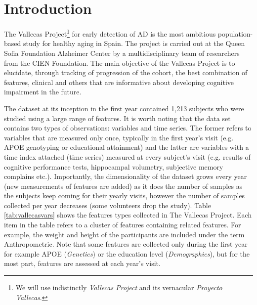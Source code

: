 \documentclass[11pt]{article}
\theoremstyle{definition}
\theoremstyle{remark}
\begin{document}
\section{Introduction}
\label{se:int}
The Vallecas Project\footnote{We will use indistinctly \emph{Vallecas Project} and its vernacular \emph{Proyecto Vallecas}.} for early detection of AD is the most ambitious population-based study for healthy aging in Spain. The project is carried out at the Queen Sofia Foundation Alzheimer Center by a multidisciplinary team of researchers from the CIEN Foundation. The main objective of the Vallecas Project is to elucidate, through tracking of progression of the cohort, the best combination of features, clinical and others that are informative about developing cognitive impairment in the future. 

The dataset at its inception in the first year contained 1,213 subjects who were studied using a large range of features. It is worth noting that the data set contains two types of observations: variables and time series. The former refers to variables that are measured only once, typically in the first year's visit (e.g. APOE genotyping or educational attainment) and the latter are variables with a time index attached (time series) measured at every subject's visit (e.g. results of cognitive performance tests, hippocampal volumetry, subjective memory complains etc.).
Importantly, the dimensionality of the dataset grows every year (new measurements of features are added) as it does the number of samples as the subjects keep coming for their yearly visits, however the number of samples collected per year decreases (some volunteers drop the study). 
Table \ref{tab:vallecasvars} shows the features types collected in The Vallecas Project. Each item in the table refers to a cluster of features containing related features. For example, the weight and height of the participants are included under the term Anthropometric. Note that some features are collected only during the first year for example APOE (\emph{Genetics}) or the education level (\emph{Demographics}), but for the most part, features are assessed at each year's visit.
\end{document}

